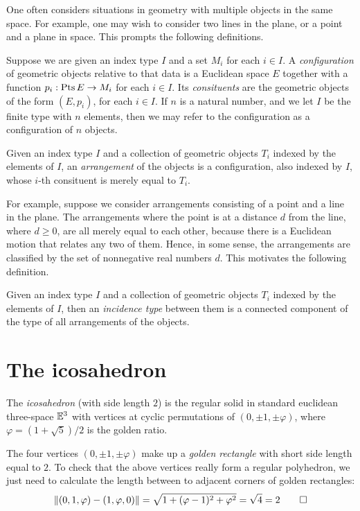 One often considers situations in geometry with multiple objects in the same
space.  For example, one may wish to consider two lines in the plane, or a
point and a plane in space.  This prompts the following definitions.

\begin{definition}
  Suppose we are given an index type $I$ and a set $M_i$ for each $i\in I$.  A
  {\em configuration} of geometric objects relative to that data is a Euclidean
  space $E$ together with a function $p_i : \Points E \to M_i$ for each
  $i\in I$.  Its {\em consituents} are the geometric objects of the form
  $(E,p_i)$, for each $i \in I$.  If $n$ is a natural number, and we let $I$ be
  the finite type with $n$ elements, then we may refer to the configuration as
  a configuration of $n$ objects.  
\end{definition}

\begin{definition}
  Given an index type $I$ and a collection of geometric objects $T_i$ indexed
  by the elements of $I$, an {\em arrangement} of the objects is a
  configuration, also indexed by $I$, whose $i$-th consituent is merely equal to
  $T_i$.
\end{definition}

For example, suppose we consider arrangements consisting of a point and a line
in the plane.  The arrangements where the point is at a distance $d$ from the
line, where $d \ge 0$, are all merely equal to each other, because there is a
Euclidean motion that relates any two of them.  Hence, in some sense, the
arrangements are classified by the set of nonnegative real numbers $d$.  This
motivates the following definition.

\begin{definition}
  Given an index type $I$ and a collection of geometric objects $T_i$ indexed
  by the elements of $I$, then an {\em incidence type} between them is a
  connected component of the type of all arrangements of the objects.
\end{definition}

\section{The icosahedron}

\begin{definition}
  The \emph{icosahedron} (with side length $2$)
  is the regular solid in standard euclidean
  three-space $\mathbb E^3$ with vertices at cyclic permutations of
  $(0,\pm1,\pm\varphi)$, where $\varphi = (1+\sqrt5)/2$ is the golden ratio.
\end{definition}
\begin{remark}
  The four vertices $(0,\pm1,\pm\varphi)$ make up a \emph{golden rectangle}
  with short side length equal to $2$. To check that the above vertices really form a regular polyhedron, we just need to calculate the length between to adjacent corners of golden rectangles:
  \[
    \lVert(0,1,\varphi)-(1,\varphi,0)\rVert
    = \sqrt{1 + (\varphi-1)^2 + \varphi^2}
    = \sqrt{4} = 2\qedhere
  \]
\end{remark}

